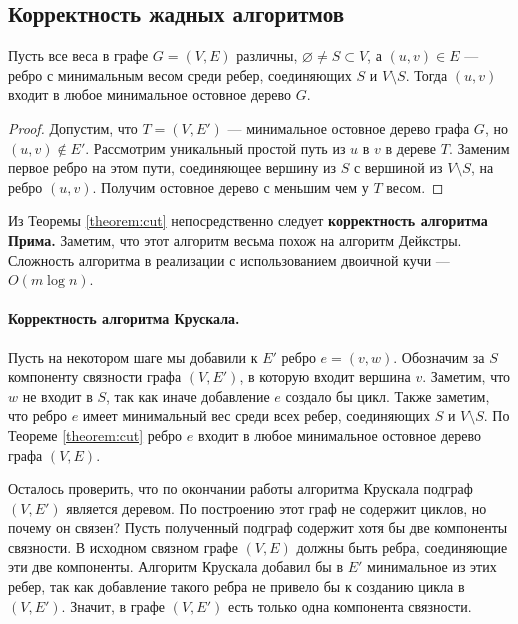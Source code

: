 \documentclass[a4paper,12pt]{article}
\begin{document}
\subsection{Корректность жадных алгоритмов}

	\begin{theorem}\label{theorem:cut}
		Пусть все веса в графе $G = (V, E)$ различны, $\varnothing \neq S \subset V$, а $(u, v) \in E$ --- ребро с минимальным весом среди ребер, соединяющих $S$ и $V \setminus S$. Тогда $(u, v)$ входит в любое минимальное остовное дерево $G$.
	\end{theorem}
	\begin{proof}
		Допустим, что $T = (V, E')$ --- минимальное остовное дерево графа $G$, но $(u, v) \not\in E'$. Рассмотрим уникальный простой путь из $u$ в $v$ в дереве $T$. Заменим первое ребро на этом пути, соединяющее вершину из $S$ с вершиной из $V \setminus S$, на ребро $(u, v)$. Получим остовное дерево с меньшим чем у $T$ весом.
	\end{proof}

Из Теоремы \ref{theorem:cut} непосредственно следует \textbf{корректность алгоритма Прима.} Заметим, что этот алгоритм весьма похож на алгоритм Дейкстры. Сложность алгоритма в реализации с использованием двоичной кучи --- $O(m\log n)$.

\paragraph{Корректность алгоритма Крускала.} Пусть на некотором шаге мы добавили к $E'$ ребро $e = (v, w)$. Обозначим за $S$ компоненту связности графа $(V, E')$, в которую входит вершина $v$. Заметим, что $w$ не входит в $S$, так как иначе добавление $e$ создало бы цикл. Также заметим, что ребро $e$ имеет минимальный вес среди всех ребер, соединяющих  $S$ и $V \setminus S$. По Теореме \ref{theorem:cut} ребро $e$ входит в любое минимальное остовное дерево графа $(V, E)$.

Осталось проверить, что по окончании работы алгоритма Крускала подграф $(V, E')$ является деревом. По построению этот граф не содержит циклов, но почему он связен? Пусть полученный подграф содержит хотя бы две компоненты связности. В исходном связном графе $(V, E)$ должны быть ребра, соединяющие эти две компоненты. Алгоритм Крускала добавил бы в $E'$ минимальное из этих ребер, так как добавление такого ребра не привело бы к созданию цикла в $(V, E')$. Значит, в графе $(V, E')$ есть только одна компонента связности.
\end{document}
